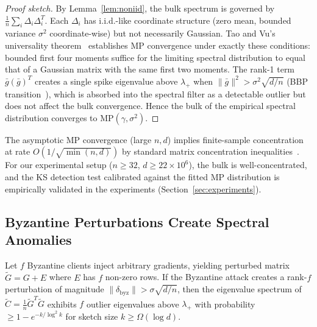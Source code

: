 \begin{proof}[Proof sketch]
By Lemma~\ref{lem:noniid}, the bulk spectrum is governed by
$\frac{1}{n}\sum_i \Delta_i \Delta_i^T$.
Each $\Delta_i$ has i.i.d.-like coordinate structure (zero mean, bounded variance $\sigma^2$
coordinate-wise) but not necessarily Gaussian.
Tao and Vu's universality theorem~\cite{rmt_modern} establishes MP convergence under exactly
these conditions: bounded first four moments suffice for the limiting spectral distribution
to equal that of a Gaussian matrix with the same first two moments.
The rank-1 term $\bar{g}(\bar{g})^T$ creates a single spike eigenvalue above $\lambda_+$
when $\|\bar{g}\|^2 > \sigma^2 \sqrt{d/n}$ (BBP transition~\cite{bbp_transition}),
which is absorbed into the spectral filter as a detectable outlier but does not affect
the bulk convergence.
Hence the bulk of the empirical spectral distribution converges to MP$(\gamma, \sigma^2)$.
\end{proof}

\begin{remark}
The asymptotic MP convergence (large $n, d$) implies finite-sample concentration
at rate $O(1/\sqrt{\min(n,d)})$ by standard matrix concentration inequalities~\cite{rmt_modern}.
For our experimental setup ($n \geq 32$, $d \geq 22 \times 10^6$), the bulk is well-concentrated,
and the KS detection test calibrated against the fitted MP distribution is empirically validated
in the experiments (Section~\ref{sec:experiments}).
\end{remark}

\subsection{Byzantine Perturbations Create Spectral Anomalies}

\begin{theorem}
\label{thm:spectral_anomaly}
Let $f$ Byzantine clients inject arbitrary gradients, yielding perturbed matrix
$\tilde{G} = G + E$ where $E$ has $f$ non-zero rows.
If the Byzantine attack creates a rank-$f$ perturbation of magnitude
$\|\delta_{\mathrm{byz}}\| > \sigma\sqrt{d/n}$, then the eigenvalue spectrum of
$\tilde{C} = \frac{1}{n}\tilde{G}^T\tilde{G}$ exhibits $f$ outlier eigenvalues above
$\lambda_+$ with probability $\geq 1 - e^{-k/\log^2 k}$ for sketch size $k \geq \Omega(\log d)$.
\end{theorem}

